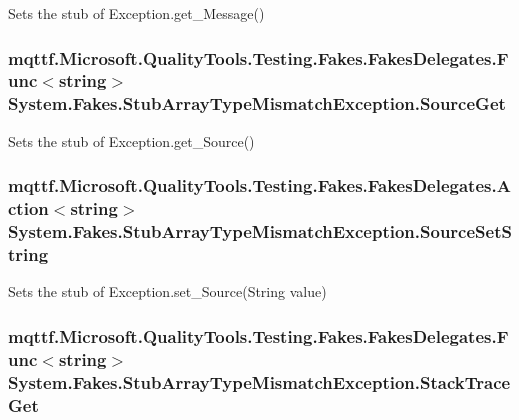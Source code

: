 Sets the stub of Exception.\-get\-\_\-\-Message()

\hypertarget{class_system_1_1_fakes_1_1_stub_array_type_mismatch_exception_aa746a24eb9ec4fc95fd3dbd7cb06b94b}{
\subsubsection[{Source\-Get}]{\setlength{\rightskip}{0pt plus 5cm}mqttf.\-Microsoft.\-Quality\-Tools.\-Testing.\-Fakes.\-Fakes\-Delegates.\-Func$<$string$>$ System.\-Fakes.\-Stub\-Array\-Type\-Mismatch\-Exception.\-Source\-Get}}\label{class_system_1_1_fakes_1_1_stub_array_type_mismatch_exception_aa746a24eb9ec4fc95fd3dbd7cb06b94b}


Sets the stub of Exception.\-get\-\_\-\-Source()

\hypertarget{class_system_1_1_fakes_1_1_stub_array_type_mismatch_exception_a38b0ae1e233e9ab5f8ddb10332cf50f1}{
\subsubsection[{Source\-Set\-String}]{\setlength{\rightskip}{0pt plus 5cm}mqttf.\-Microsoft.\-Quality\-Tools.\-Testing.\-Fakes.\-Fakes\-Delegates.\-Action$<$string$>$ System.\-Fakes.\-Stub\-Array\-Type\-Mismatch\-Exception.\-Source\-Set\-String}}\label{class_system_1_1_fakes_1_1_stub_array_type_mismatch_exception_a38b0ae1e233e9ab5f8ddb10332cf50f1}


Sets the stub of Exception.\-set\-\_\-\-Source(\-String value)

\hypertarget{class_system_1_1_fakes_1_1_stub_array_type_mismatch_exception_a63c78e9aec61d0320e8977161250b26c}{
\subsubsection[{Stack\-Trace\-Get}]{\setlength{\rightskip}{0pt plus 5cm}mqttf.\-Microsoft.\-Quality\-Tools.\-Testing.\-Fakes.\-Fakes\-Delegates.\-Func$<$string$>$ System.\-Fakes.\-Stub\-Array\-Type\-Mismatch\-Exception.\-Stack\-Trace\-Get}}\label{class_system_1_1_fakes_1_1_stub_array_type_mismatch_exception_a63c78e9aec61d0320e8977161250b26c}


